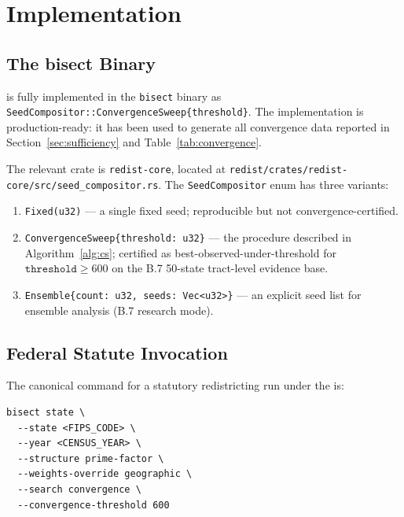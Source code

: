 \section{Implementation}
\label{sec:implementation}

\subsection{The bisect Binary}

\cs{} is fully implemented in the \texttt{bisect} binary as
\texttt{SeedCompositor::ConvergenceSweep\{threshold\}}.
The implementation is production-ready: it has been used to generate all
convergence data reported in Section~\ref{sec:sufficiency} and Table~\ref{tab:convergence}.

The relevant crate is \texttt{redist-core}, located at
\texttt{redist/crates/redist-core/src/seed\_compositor.rs}.
The \texttt{SeedCompositor} enum has three variants:

\begin{enumerate}
\item \texttt{Fixed(u32)} --- a single fixed seed; reproducible but not
      convergence-certified.
\item \texttt{ConvergenceSweep\{threshold: u32\}} --- the \cs{} procedure
      described in Algorithm~\ref{alg:cs}; certified as
      best-observed-under-threshold for $\texttt{threshold} \ge 600$ on the
      B.7 50-state tract-level evidence base.
\item \texttt{Ensemble\{count: u32, seeds: Vec<u32>\}} --- an explicit seed
      list for ensemble analysis (B.7 research mode).
\end{enumerate}

\subsection{Federal Statute Invocation}

The canonical command for a statutory redistricting run under the \dia{}
is:

\begin{verbatim}
bisect state \
  --state <FIPS_CODE> \
  --year <CENSUS_YEAR> \
  --structure prime-factor \
  --weights-override geographic \
  --search convergence \
  --convergence-threshold 600
\end{verbatim}

